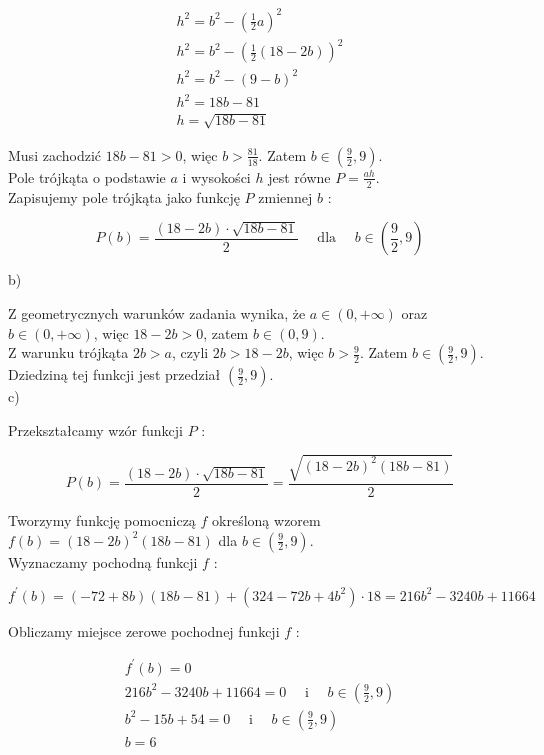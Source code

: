 \documentclass[10pt]{article}
\begin{document}
$$
\begin{gathered}
h^{2}=b^{2}-\left(\frac{1}{2} a\right)^{2} \\
h^{2}=b^{2}-\left(\frac{1}{2}(18-2 b)\right)^{2} \\
h^{2}=b^{2}-(9-b)^{2} \\
h^{2}=18 b-81 \\
h=\sqrt{18 b-81}
\end{gathered}
$$

Musi zachodzić $18 b-81>0$, więc $b>\frac{81}{18}$. Zatem $b \in\left(\frac{9}{2}, 9\right)$.\\
Pole trójkąta o podstawie $a$ i wysokości $h$ jest równe $P=\frac{a h}{2}$.\\
Zapisujemy pole trójkąta jako funkcję $P$ zmiennej $b$ :

$$
P(b)=\frac{(18-2 b) \cdot \sqrt{18 b-81}}{2} \quad \text { dla } \quad b \in\left(\frac{9}{2}, 9\right)
$$

b)

Z geometrycznych warunków zadania wynika, że $a \in(0,+\infty)$ oraz $b \in(0,+\infty)$, więc $18-2 b>0$, zatem $b \in(0,9)$.\\
Z warunku trójkąta $2 b>a$, czyli $2 b>18-2 b$, więc $b>\frac{9}{2}$. Zatem $b \in\left(\frac{9}{2}, 9\right)$.\\
Dziedziną tej funkcji jest przedział $\left(\frac{9}{2}, 9\right)$.\\
c)

Przekształcamy wzór funkcji $P$ :

$$
P(b)=\frac{(18-2 b) \cdot \sqrt{18 b-81}}{2}=\frac{\sqrt{(18-2 b)^{2}(18 b-81)}}{2}
$$

Tworzymy funkcję pomocniczą $f$ określoną wzorem\\
$f(b)=(18-2 b)^{2}(18 b-81)$ dla $b \in\left(\frac{9}{2}, 9\right)$.\\
Wyznaczamy pochodną funkcji $f$ :

$$
f^{\prime}(b)=(-72+8 b)(18 b-81)+\left(324-72 b+4 b^{2}\right) \cdot 18=216 b^{2}-3240 b+11664
$$

Obliczamy miejsce zerowe pochodnej funkcji $f$ :

$$
\begin{gathered}
f^{\prime}(b)=0 \\
216 b^{2}-3240 b+11664=0 \quad \text { i } \quad b \in\left(\frac{9}{2}, 9\right) \\
b^{2}-15 b+54=0 \quad \text { i } \quad b \in\left(\frac{9}{2}, 9\right) \\
b=6
\end{gathered}
$$
\end{document}
